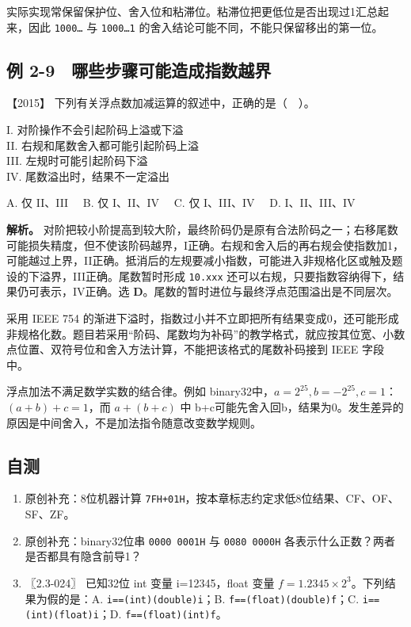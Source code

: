 实际实现常保留保护位、舍入位和粘滞位。粘滞位把更低位是否出现过1汇总起来，因此 \allowbreak{}\texttt{1000…} 与 \allowbreak{}\texttt{1000…1} 的舍入结论可能不同，不能只保留移出的第一位。


\subsection{例 2-9　哪些步骤可能造成指数越界}\label{co-ex2-9}

\noindent{}【2015】 下列有关浮点数加减运算的叙述中，正确的是（　）。

I. 对阶操作不会引起阶码上溢或下溢\\
II. 右规和尾数舍入都可能引起阶码上溢\\
III. 左规时可能引起阶码下溢\\
IV. 尾数溢出时，结果不一定溢出

A. 仅 II、III　 B. 仅 I、II、IV　 C. 仅 I、III、IV　 D. I、II、III、IV


\textbf{解析。} 对阶把较小阶提高到较大阶，最终阶码仍是原有合法阶码之一；右移尾数可能损失精度，但不使该阶码越界，I正确。右规和舍入后的再右规会使指数加1，可能越过上界，II正确。抵消后的左规要减小指数，可能进入非规格化区或触及题设的下溢界，III正确。尾数暂时形成 \allowbreak{}\texttt{10.xxx} 还可以右规，只要指数容纳得下，结果仍可表示，IV正确。选 \textbf{D}。尾数的暂时进位与最终浮点范围溢出是不同层次。

采用 IEEE 754 的渐进下溢时，指数过小并不立即把所有结果变成0，还可能形成非规格化数。题目若采用``阶码、尾数均为补码''的教学格式，就应按其位宽、小数点位置、双符号位和舍入方法计算，不能把该格式的尾数补码接到 IEEE 字段中。

浮点加法不满足数学实数的结合律。例如 binary32中，\(a=2^{25},b=-2^{25},c=1\)：\((a+b)+c=1\)，而 \(a+(b+c)\) 中 b+c可能先舍入回b，结果为0。发生差异的原因是中间舍入，不是加法指令随意改变数学规则。

\subsection{自测}\label{co-self2}

\begin{enumerate}
\def\labelenumi{\arabic{enumi}.}
\tightlist
\item
  原创补充：8位机器计算 \allowbreak{}\texttt{7FH+01H}，按本章标志约定求低8位结果、CF、OF、SF、ZF。
\item
  原创补充：binary32位串 \allowbreak{}\texttt{0000\ 0001H} 与 \allowbreak{}\texttt{0080\ 0000H} 各表示什么正数？两者是否都具有隐含前导1？
\item
  〖2.3-024〗 已知32位 int 变量 i=12345，float 变量 \(f=1.2345\times2^3\)。下列结果为假的是：A. \allowbreak{}\texttt{i==(int)(double)i}；B. \allowbreak{}\texttt{f==(float)(double)f}；C. \allowbreak{}\texttt{i==(int)(float)i}；D. \allowbreak{}\texttt{f==(float)(int)f}。
\end{enumerate}

